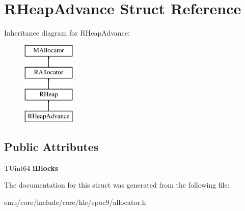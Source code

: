 \hypertarget{struct_r_heap_advance}{}\section{R\+Heap\+Advance Struct Reference}
\label{struct_r_heap_advance}
Inheritance diagram for R\+Heap\+Advance\+:\begin{figure}[H]
\begin{center}
\leavevmode
\includegraphics[height=4.000000cm]{struct_r_heap_advance}
\end{center}
\end{figure}
\subsection*{Public Attributes}
\begin{DoxyCompactItemize}
\item 
\mbox{\label{struct_r_heap_advance_a0b9eebd7f523cc15445364e3abb4588d}} 
T\+Uint64 {\bfseries i\+Blocks}
\end{DoxyCompactItemize}


The documentation for this struct was generated from the following file\+:\begin{DoxyCompactItemize}
\item 
emu/core/include/core/hle/epoc9/allocator.\+h\end{DoxyCompactItemize}
